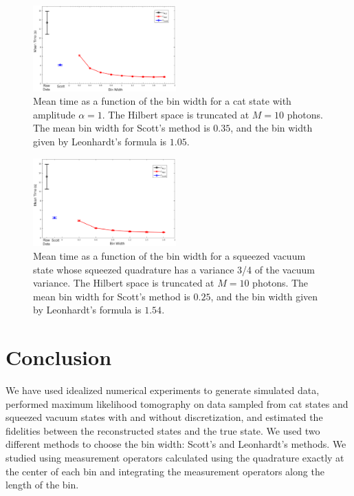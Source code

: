 \documentclass[
reprint,
superscriptaddress,
showpacs,
amsmath,
amssymb,
aps,
pra,
longbibliography
]{revtex4-1}
\begin{document}
\begin{figure}
  \includegraphics[width=0.49\textwidth]{time-estadogato_alpha_1.eps}
  \caption{Mean time as a function of the bin width for a cat state
    with amplitude $\alpha = 1$. The Hilbert space is truncated at $M=10$
    photons. The mean bin width for Scott's method is $0.35$, and the
    bin width given by Leonhardt's formula is $1.05$.}
  \label{fig-time-catstate}
\end{figure}

\begin{figure}
  \includegraphics[width=0.49\textwidth]{time-vacuocomprimido.eps}
  \caption{Mean time as a function of the bin width for a squeezed
    vacuum state whose squeezed quadrature has a variance 3/4 of the
    vacuum variance. The Hilbert space is truncated at $M=10$ photons. The
    mean bin width for Scott's method is $0.25$, and the bin width
    given by Leonhardt's formula is $1.54$.}
  \label{fig-time-squeezed}
\end{figure}

\section{Conclusion}
\label{conclusion}

We have used idealized numerical experiments to generate simulated
data, performed maximum likelihood tomography on data sampled
from cat states and squeezed vacuum states with and without
discretization, and estimated the fidelities between
the reconstructed states and the true state. We used two different
methods to choose the bin width: Scott's and Leonhardt's methods. We
studied using measurement operators calculated using the
quadrature exactly at the center of each bin and integrating the
measurement operators along the length of the bin. 
\end{document}
